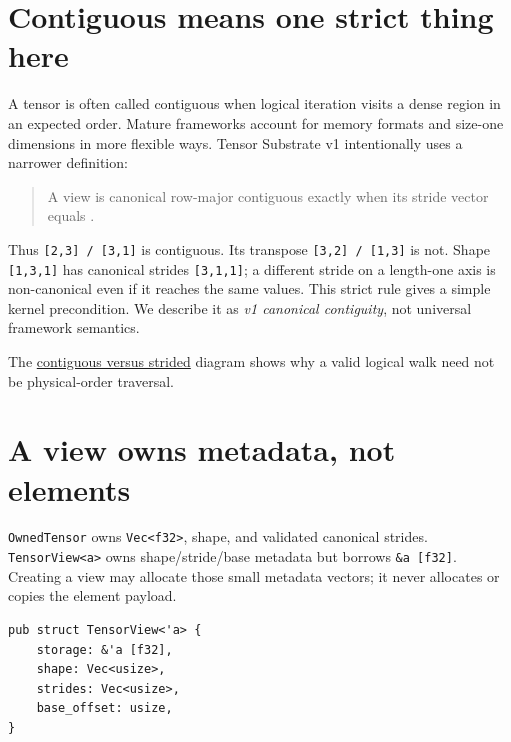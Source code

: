 \section{Contiguous means one strict thing
here}\label{contiguous-means-one-strict-thing-here}

A tensor is often called contiguous when logical iteration visits a
dense region in an expected order. Mature frameworks account for memory
formats and size-one dimensions in more flexible ways. Tensor Substrate
v1 intentionally uses a narrower definition:

\begin{quote}
A view is canonical row-major contiguous exactly when its stride vector
equals \texttt{}.
\end{quote}

Thus \texttt{{[}2,3{]}\ /\ {[}3,1{]}} is contiguous. Its transpose
\texttt{{[}3,2{]}\ /\ {[}1,3{]}} is not. Shape \texttt{{[}1,3,1{]}} has
canonical strides \texttt{{[}3,1,1{]}}; a different stride on a
length-one axis is non-canonical even if it reaches the same values.
This strict rule gives  a simple kernel precondition. We
describe it as \emph{v1 canonical contiguity}, not universal framework
semantics.

The
\href{https://github.com/hermonai/inside-the-llm-engine/blob/astra-visual-rewrite/diagrams/tensor/contiguous-vs-strided.txt}{contiguous
versus strided} diagram shows why a valid logical walk need not be
physical-order traversal.

\section{A view owns metadata, not
elements}\label{a-view-owns-metadata-not-elements}

\texttt{OwnedTensor} owns \texttt{Vec\textless{}f32\textgreater{}},
shape, and validated canonical strides.
\texttt{TensorView\textless{}\textquotesingle{}a\textgreater{}} owns
shape/stride/base metadata but borrows
\texttt{\&\textquotesingle{}a\ {[}f32{]}}. Creating a view may allocate
those small metadata vectors; it never allocates or copies the element
payload.

\begin{verbatim}
pub struct TensorView<'a> {
    storage: &'a [f32],
    shape: Vec<usize>,
    strides: Vec<usize>,
    base_offset: usize,
}
\end{verbatim}


